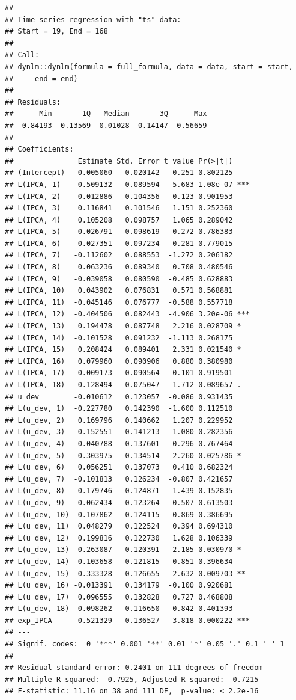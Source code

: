 \documentclass[
]{article}
\begin{document}
\begin{verbatim}
## 
## Time series regression with "ts" data:
## Start = 19, End = 168
## 
## Call:
## dynlm::dynlm(formula = full_formula, data = data, start = start, 
##     end = end)
## 
## Residuals:
##      Min       1Q   Median       3Q      Max 
## -0.84193 -0.13569 -0.01028  0.14147  0.56659 
## 
## Coefficients:
##               Estimate Std. Error t value Pr(>|t|)    
## (Intercept)  -0.005060   0.020142  -0.251 0.802125    
## L(IPCA, 1)    0.509132   0.089594   5.683 1.08e-07 ***
## L(IPCA, 2)   -0.012886   0.104356  -0.123 0.901953    
## L(IPCA, 3)    0.116841   0.101546   1.151 0.252360    
## L(IPCA, 4)    0.105208   0.098757   1.065 0.289042    
## L(IPCA, 5)   -0.026791   0.098619  -0.272 0.786383    
## L(IPCA, 6)    0.027351   0.097234   0.281 0.779015    
## L(IPCA, 7)   -0.112602   0.088553  -1.272 0.206182    
## L(IPCA, 8)    0.063236   0.089340   0.708 0.480546    
## L(IPCA, 9)   -0.039058   0.080590  -0.485 0.628883    
## L(IPCA, 10)   0.043902   0.076831   0.571 0.568881    
## L(IPCA, 11)  -0.045146   0.076777  -0.588 0.557718    
## L(IPCA, 12)  -0.404506   0.082443  -4.906 3.20e-06 ***
## L(IPCA, 13)   0.194478   0.087748   2.216 0.028709 *  
## L(IPCA, 14)  -0.101528   0.091232  -1.113 0.268175    
## L(IPCA, 15)   0.208424   0.089401   2.331 0.021540 *  
## L(IPCA, 16)   0.079960   0.090906   0.880 0.380980    
## L(IPCA, 17)  -0.009173   0.090564  -0.101 0.919501    
## L(IPCA, 18)  -0.128494   0.075047  -1.712 0.089657 .  
## u_dev        -0.010612   0.123057  -0.086 0.931435    
## L(u_dev, 1)  -0.227780   0.142390  -1.600 0.112510    
## L(u_dev, 2)   0.169796   0.140662   1.207 0.229952    
## L(u_dev, 3)   0.152551   0.141213   1.080 0.282356    
## L(u_dev, 4)  -0.040788   0.137601  -0.296 0.767464    
## L(u_dev, 5)  -0.303975   0.134514  -2.260 0.025786 *  
## L(u_dev, 6)   0.056251   0.137073   0.410 0.682324    
## L(u_dev, 7)  -0.101813   0.126234  -0.807 0.421657    
## L(u_dev, 8)   0.179746   0.124871   1.439 0.152835    
## L(u_dev, 9)  -0.062434   0.123264  -0.507 0.613503    
## L(u_dev, 10)  0.107862   0.124115   0.869 0.386695    
## L(u_dev, 11)  0.048279   0.122524   0.394 0.694310    
## L(u_dev, 12)  0.199816   0.122730   1.628 0.106339    
## L(u_dev, 13) -0.263087   0.120391  -2.185 0.030970 *  
## L(u_dev, 14)  0.103658   0.121815   0.851 0.396634    
## L(u_dev, 15) -0.333328   0.126655  -2.632 0.009703 ** 
## L(u_dev, 16) -0.013391   0.134179  -0.100 0.920681    
## L(u_dev, 17)  0.096555   0.132828   0.727 0.468808    
## L(u_dev, 18)  0.098262   0.116650   0.842 0.401393    
## exp_IPCA      0.521329   0.136527   3.818 0.000222 ***
## ---
## Signif. codes:  0 '***' 0.001 '**' 0.01 '*' 0.05 '.' 0.1 ' ' 1
## 
## Residual standard error: 0.2401 on 111 degrees of freedom
## Multiple R-squared:  0.7925, Adjusted R-squared:  0.7215 
## F-statistic: 11.16 on 38 and 111 DF,  p-value: < 2.2e-16
\end{verbatim}
\end{document}

